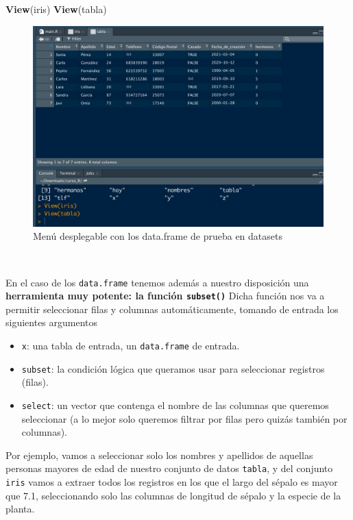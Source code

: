 \documentclass[11pt,]{book}
\newenvironment{Shaded}{\begin{snugshade}}{\end{snugshade}}
\newcommand{\KeywordTok}[1]{\textcolor[rgb]{0.27,0.27,0.27}{\textbf{#1}}}
\newcommand{\NormalTok}[1]{#1}
\providecommand{\tightlist}{%
  \setlength{\itemsep}{0pt}\setlength{\parskip}{0pt}}
\begin{document}
\begin{Shaded}
\begin{Highlighting}[]
\KeywordTok{View}\NormalTok{(iris)}
\KeywordTok{View}\NormalTok{(tabla)}
\end{Highlighting}
\end{Shaded}

\begin{figure}

{\centering \includegraphics[width=0.5\linewidth]{./img/view_datasets} 

}

\caption{Menú desplegable con los data.frame de prueba en datasets}\label{fig:view-datasets}
\end{figure}

~

En el caso de los \texttt{data.frame} tenemos además a nuestro disposición una \textbf{herramienta muy potente: la función \texttt{subset()}} Dicha función nos va a permitir seleccionar filas y columnas automáticamente, tomando de entrada los siguientes argumentos

\begin{itemize}
\tightlist
\item
  \texttt{x}: una tabla de entrada, un \texttt{data.frame} de entrada.
\item
  \texttt{subset}: la condición lógica que queramos usar para seleccionar registros (filas).
\item
  \texttt{select}: un vector que contenga el nombre de las columnas que queremos seleccionar (a lo mejor solo queremos filtrar por filas pero quizás también por columnas).
\end{itemize}

Por ejemplo, vamos a seleccionar solo los nombres y apellidos de aquellas personas mayores de edad de nuestro conjunto de datos \texttt{tabla}, y del conjunto \texttt{iris} vamos a extraer todos los registros en los que el largo del sépalo es mayor que 7.1, seleccionando solo las columnas de longitud de sépalo y la especie de la planta.
\end{document}
